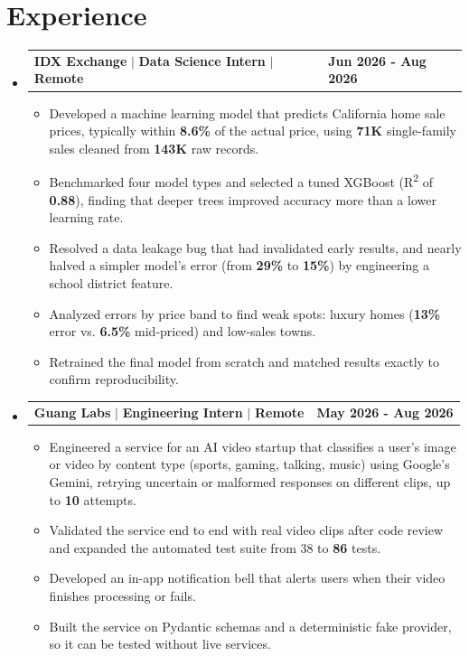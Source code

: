 \documentclass[letterpaper,11pt]{article}
\makeatletter
\newcommand{\resumeItem}[1]{
  \item\small{
    {#1 \vspace{-2pt}}
  }
}
\newcommand{\resumeCompactHeading}[4]{
  \vspace{-1pt}\item
    \begin{tabularx}{1.0\textwidth}[t]{@{}X@{}>{\raggedright\arraybackslash}p{1.5in}@{}}
      \textbf{#1} $|$ \textbf{#2} $|$ \textbf{\small #3} & \textbf{\small #4} \\
    \end{tabularx}\vspace{-3pt}
}
\newcommand{\resumeSubHeadingListStart}{\begin{itemize}[leftmargin=0.0in, label={}]}
\newcommand{\resumeSubHeadingListEnd}{\end{itemize}}
\newcommand{\resumeItemListStart}{\begin{itemize}[itemsep=2.5pt, topsep=3pt]}
\newcommand{\resumeItemListEnd}{\end{itemize}\vspace{-4pt}}
\makeatother
\begin{document}
\section{Experience}
  \resumeSubHeadingListStart

    \resumeCompactHeading
        {IDX Exchange}{Data Science Intern}{Remote}{Jun 2026 - Aug 2026}
        \resumeItemListStart
            \resumeItem{Developed a machine learning model that predicts California home sale prices, typically within \textbf{8.6\%} of the actual price, using \textbf{71K} single-family sales cleaned from \textbf{143K} raw records.}
            \resumeItem{Benchmarked four model types and selected a tuned XGBoost (R\textsuperscript{2} of \textbf{0.88}), finding that deeper trees improved accuracy more than a lower learning rate.}
            \resumeItem{Resolved a data leakage bug that had invalidated early results, and nearly halved a simpler model's error (from \textbf{29\%} to \textbf{15\%}) by engineering a school district feature.}
            \resumeItem{Analyzed errors by price band to find weak spots: luxury homes (\textbf{13\%} error vs. \textbf{6.5\%} mid-priced) and low-sales towns.}
            \resumeItem{Retrained the final model from scratch and matched results exactly to confirm reproducibility.}
        \resumeItemListEnd

    \resumeCompactHeading
        {Guang Labs}{Engineering Intern}{Remote}{May 2026 - Aug 2026}
        \resumeItemListStart
             \resumeItem{Engineered a service for an AI video startup that classifies a user's image or video by content type (sports, gaming, talking, music) using Google's Gemini, retrying uncertain or malformed responses on different clips, up to \textbf{10} attempts.}
             \resumeItem{Validated the service end to end with real video clips after code review and expanded the automated test suite from 38 to \textbf{86} tests.}
             \resumeItem{Developed an in-app notification bell that alerts users when their video finishes processing or fails.}
             \resumeItem{Built the service on Pydantic schemas and a deterministic fake provider, so it can be tested without live services.}
        \resumeItemListEnd

  \resumeSubHeadingListEnd
\vspace{-12pt}

\end{document}
